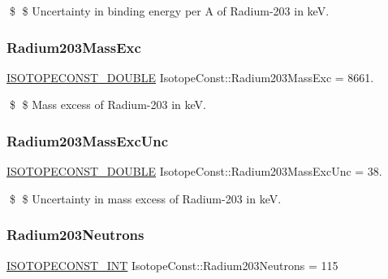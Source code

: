 \$ \$ Uncertainty in binding energy per A of Radium-\/203 in keV. \mbox{\label{group___isotope_const-_radium-_ra203_ga7412c249c351b1e46cfb7b7f56925bec}} 
\subsubsection{\texorpdfstring{Radium203\+Mass\+Exc}{Radium203MassExc}}
{\footnotesize\ttfamily \mbox{\hyperlink{group___isotope_const-_macros_ga8f45a7272ce02c0b4c65c44636ed719a}{I\+S\+O\+T\+O\+P\+E\+C\+O\+N\+S\+T\+\_\+\+D\+O\+U\+B\+LE}} Isotope\+Const\+::\+Radium203\+Mass\+Exc = 8661.}

\$ \$ Mass excess of Radium-\/203 in keV. \mbox{\label{group___isotope_const-_radium-_ra203_ga9e62b74a3f75053f7ce30156845f6537}} 
\subsubsection{\texorpdfstring{Radium203\+Mass\+Exc\+Unc}{Radium203MassExcUnc}}
{\footnotesize\ttfamily \mbox{\hyperlink{group___isotope_const-_macros_ga8f45a7272ce02c0b4c65c44636ed719a}{I\+S\+O\+T\+O\+P\+E\+C\+O\+N\+S\+T\+\_\+\+D\+O\+U\+B\+LE}} Isotope\+Const\+::\+Radium203\+Mass\+Exc\+Unc = 38.}

\$ \$ Uncertainty in mass excess of Radium-\/203 in keV. \mbox{\label{group___isotope_const-_radium-_ra203_ga5df074728c7808f4f94a46da9e8b55a8}} 
\subsubsection{\texorpdfstring{Radium203\+Neutrons}{Radium203Neutrons}}
{\footnotesize\ttfamily \mbox{\hyperlink{group___isotope_const-_macros_ga5f18360b3e99483a35c32d789e62621c}{I\+S\+O\+T\+O\+P\+E\+C\+O\+N\+S\+T\+\_\+\+I\+NT}} Isotope\+Const\+::\+Radium203\+Neutrons = 115}

